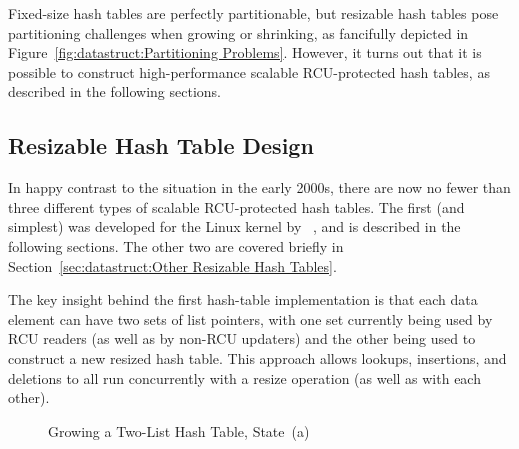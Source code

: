 Fixed-size hash tables are perfectly partitionable, but resizable hash
tables pose partitioning challenges when growing or shrinking, as
fancifully depicted in
Figure~\ref{fig:datastruct:Partitioning Problems}.
However, it turns out that it is possible to construct high-performance
scalable RCU-protected hash tables, as described in the following sections.

\subsection{Resizable Hash Table Design}
\label{sec:datastruct:Resizable Hash Table Design}

In happy contrast to the situation in the early 2000s, there are now
no fewer than three different types of scalable RCU-protected hash
tables.
The first (and simplest) was developed for the Linux kernel by
~\cite{HerbertXu2010RCUResizeHash}, and is described in the
following sections.
The other two are covered briefly in
Section~\ref{sec:datastruct:Other Resizable Hash Tables}.

The key insight behind the first hash-table implementation is that
each data element can have two sets of list pointers, with one set
currently being used by RCU readers (as well as by non-RCU updaters)
and the other being used to construct a new resized hash table.
This approach allows lookups, insertions, and deletions to all run
concurrently with a resize operation (as well as with each other).

\begin{figure}[tb]
\centering
{}
\caption{Growing a Two-List Hash Table, State~(a)}
\label{fig:datastruct:Growing a Two-List Hash Table; State (a)}
\end{figure}

